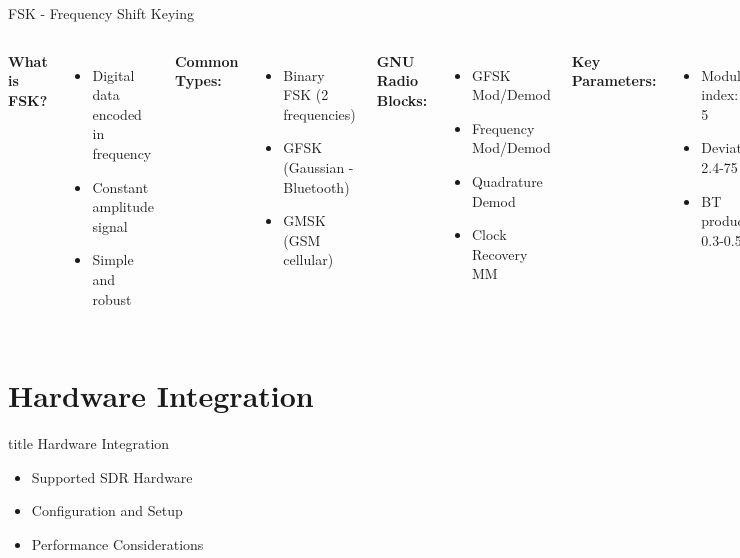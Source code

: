 \documentclass[aspectratio=169,11pt]{beamer}
\begin{document}
\begin{frame}{FSK - Frequency Shift Keying}
\begin{columns}
\textbf{What is FSK?}
\begin{itemize}
    \item Digital data encoded in frequency
    \item Constant amplitude signal
    \item Simple and robust
\end{itemize}

\vspace{0.3cm}
\textbf{Common Types:}
\begin{itemize}
    \item Binary FSK (2 frequencies)
    \item GFSK (Gaussian - Bluetooth)
    \item GMSK (GSM cellular)
\end{itemize}

\textbf{GNU Radio Blocks:}
\begin{itemize}
    \item GFSK Mod/Demod
    \item Frequency Mod/Demod
    \item Quadrature Demod
    \item Clock Recovery MM
\end{itemize}

\vspace{0.3cm}
\textbf{Key Parameters:}
\begin{itemize}
    \item Modulation index: 0.5-5
    \item Deviation: 2.4-75 kHz
    \item BT product: 0.3-0.5
\end{itemize}
\end{columns}
\end{frame}

\section{Hardware Integration}

\begin{frame}[plain]
\vfill
\centering
\begin{beamercolorbox}[sep=8pt,center,shadow=true,rounded=true]{title}
\Large Hardware Integration\par
\end{beamercolorbox}
\vfill
\begin{itemize}
    \item Supported SDR Hardware
    \item Configuration and Setup
    \item Performance Considerations
\end{itemize}
\vfill
\end{frame}
\end{document}
